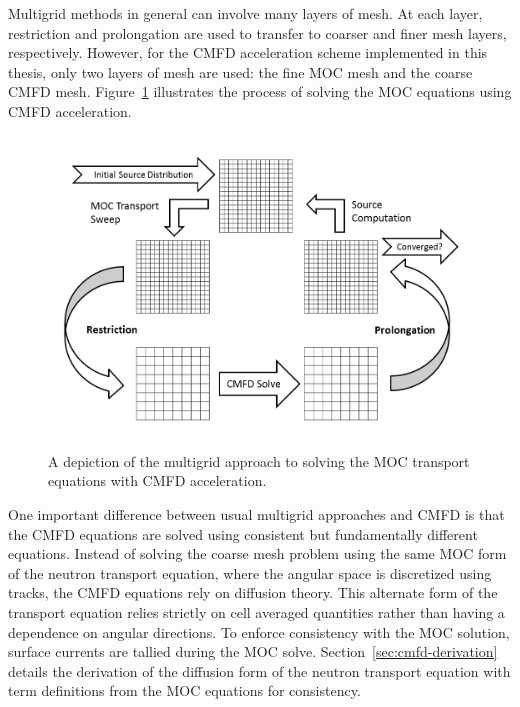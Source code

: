 Multigrid methods in general can involve many layers of mesh. At each layer, restriction and prolongation are used to transfer to coarser and finer mesh layers, respectively. However, for the \ac{CMFD} acceleration scheme implemented in this thesis, only two layers of mesh are used: the fine \ac{MOC} mesh and the coarse \ac{CMFD} mesh. Figure~\ref{fig:multigrid-cmfd} illustrates the process of solving the \ac{MOC} equations using \ac{CMFD} acceleration.
\begin{figure}[h!] 
	\centering 
	\includegraphics[width=\linewidth]{figures/multigrid-cmfd.PNG}
	\caption[]{A depiction of the multigrid approach to solving the \ac{MOC} transport equations with \ac{CMFD} acceleration.}
	\label{fig:multigrid-cmfd}
\end{figure}

One important difference between usual multigrid approaches and \ac{CMFD} is that the \ac{CMFD} equations are solved using consistent but fundamentally different equations. Instead of solving the coarse mesh problem using the same \ac{MOC} form of the neutron transport equation, where the angular space is discretized using tracks, the \ac{CMFD} equations rely on diffusion theory. This alternate form of the transport equation relies strictly on cell averaged quantities rather than having a dependence on angular directions. To enforce consistency with the \ac{MOC} solution, surface currents are tallied during the \ac{MOC} solve. Section~\ref{sec:cmfd-derivation} details the derivation of the diffusion form of the neutron transport equation with term definitions from the \ac{MOC} equations for consistency.

